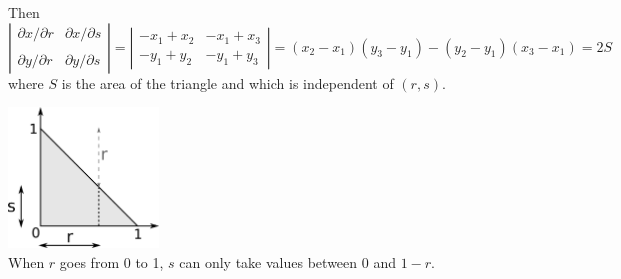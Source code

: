 Then 
\[
\left| 
\begin{array}{cc}
\partial x/\partial r & \partial x/\partial s \\ \\
\partial y/\partial r & \partial y/\partial s 
\end{array}
\right|  
=
\left| 
\begin{array}{cc}
- x_1+ x_2 & - x_1+ x_3 \\
- y_1+ y_2 & - y_1+ y_3 
\end{array}
\right|  
=
(x_2-x_1)(y_3-y_1)-(y_2-y_1)(x_3-x_1)
= 2S
\]
where $S$ is the area of the triangle and which is independent of $(r,s)$.
\begin{center}
\includegraphics[width=4cm]{images/elemental_mat/triangle} \\
{\captionfont When $r$ goes from 0 to 1, $s$ can only take values between 0 and $1-r$.}
\end{center}

